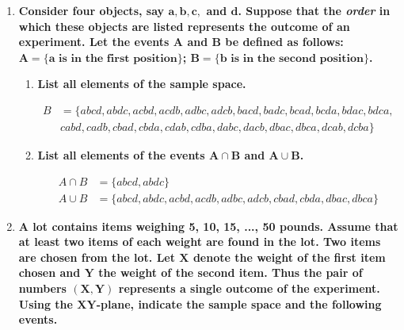 \documentclass[10pt, oneside]{article}   	%
\theoremstyle{definition}
\begin{document}
\begin{enumerate}[label=1.\arabic*]
\begin{enumerate}
	\end{enumerate}

\item  \begin{tcolorbox}[
  colback=Cerulean!5!white,
  colframe=Cerulean!75!black]
\textbf{Consider four objects, say $\bm{a, b, c,}$ and $\bm{d}$. Suppose that the \textit{order} in which these objects are listed represents the outcome of an experiment. Let the events $\bm{A}$ and $\bm{B}$ be defined as follows: $\bm{A = \{ a \text{ is in the first position}\}}$; $\bm{B = \{b \text{ is in the second position}\}}$.}
\end{tcolorbox}

	\begin{enumerate}
	\item  \begin{tcolorbox}[
	  colback=Cerulean!5!white,
	  colframe=Cerulean!75!black]
	\textbf{List all elements of the sample space.}
	\end{tcolorbox}
	
	\begin{framed}
	\begin{align*}
	B &= \{ abcd, abdc, acbd, acdb, adbc, adcb, bacd, badc, bcad, bcda, bdac, bdca, \\
	&cabd, cadb, cbad, cbda, cdab, cdba, dabc, dacb, dbac, dbca, dcab, dcba \} 
	\end{align*}
	\end{framed}
	
	\item  \begin{tcolorbox}[
	  colback=Cerulean!5!white,
	  colframe=Cerulean!75!black]
	\textbf{List all elements of the events $\bm{A \cap B}$ and $\bm{A \cup B}$.}
	\end{tcolorbox}
	
	\begin{framed}
	\begin{align*}
	A \cap B &= \{ abcd, abdc \} \\
	A \cup B &= \{ abcd, abdc, acbd, acdb, adbc, adcb, cbad, cbda, dbac, dbca \}
	\end{align*}
	\end{framed}
	
	\end{enumerate}

\item  \begin{tcolorbox}[
  colback=Cerulean!5!white,
  colframe=Cerulean!75!black]
\textbf{A lot contains items weighing 5, 10, 15, ..., 50 pounds. Assume that at least two items of each weight are found in the lot. Two items are chosen from the lot. Let $\bm{X}$ denote the weight of the first item chosen and $\bm{Y}$ the weight of the second item. Thus the pair of numbers $\bm{(X,Y)}$ represents a single outcome of the experiment. Using the $\bm{XY}$-plane, indicate the sample space and the following events.}
\end{tcolorbox}


\end{enumerate}
\end{document}
